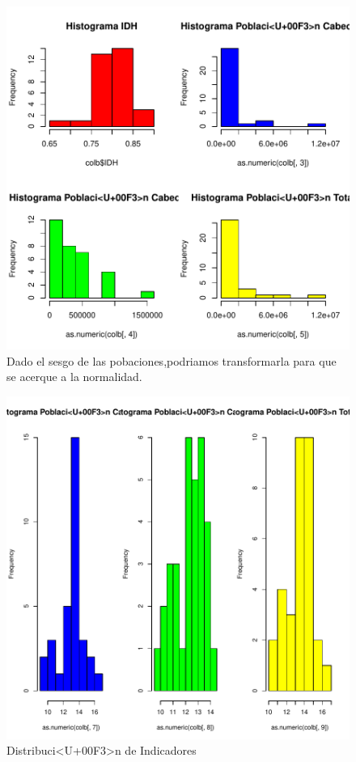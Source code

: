 \begin{figure}[h]
\centering
\includegraphics{ejemplo-barplots}
Dado el sesgo de las pobaciones,podriamos transformarla para que se acerque a la normalidad.
\begin{adjustbox}{width=9cm,height=3cm,clip,trim=1.5cm 0.5cm 0cm 1.5cm}
\includegraphics{ejemplo-barplots2}
\end{adjustbox}
\caption{Distribuci<U+00F3>n de Indicadores}
\label{barplots}
\end{figure}
\clearpage
